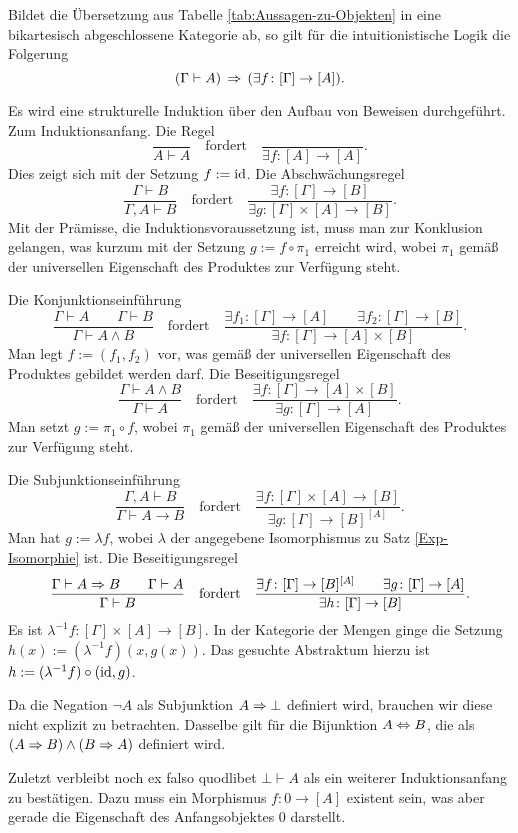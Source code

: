 \begin{Satz}\label{Urteil-impliziert-Morphismus}
Bildet die Übersetzung aus Tabelle \ref{tab:Aussagen-zu-Objekten} in
eine bikartesisch abgeschlossene Kategorie ab, so gilt für die
intuitionistische Logik die Folgerung
\[(\Gamma\vdash A) \,\Rightarrow\, (\exists f\colon [\Gamma]\to [A]).\]
\end{Satz}
\begin{Beweis}
Es wird eine strukturelle Induktion über den Aufbau von Beweisen
durchgeführt. Zum Induktionsanfang. Die Regel
\[\dfrac{}{A\vdash A}\quad\text{fordert}\quad\dfrac{}{\exists f\colon [A]\to [A]}.\]
Dies zeigt sich mit der Setzung $f:=\operatorname{id}$. Die Abschwächungsregel
\[\dfrac{\Gamma\vdash B}{\Gamma,A\vdash B}\quad\text{fordert}\quad
\dfrac{\exists f\colon [\Gamma]\to [B]}{\exists g\colon [\Gamma]\times [A]\to [B]}.\]
Mit der Prämisse, die Induktionsvoraussetzung ist, muss man zur
Konklusion gelangen, was kurzum mit der Setzung $g:=f\circ\pi_1$
erreicht wird, wobei $\pi_1$ gemäß der universellen Eigenschaft des
Produktes zur Verfügung steht.

Die Konjunktionseinführung
\[\dfrac{\Gamma\vdash A\qquad\Gamma\vdash B}{\Gamma\vdash A\land B}
\quad\text{fordert}\quad
\dfrac{\exists f_1\colon [\Gamma]\to [A]\qquad\exists f_2\colon [\Gamma]\to [B]}
{\exists f\colon [\Gamma]\to [A]\times [B]}.\]
Man legt $f:=(f_1, f_2)$ vor, was gemäß der universellen
Eigenschaft des Produktes gebildet werden darf. Die Beseitigungsregel
\[\dfrac{\Gamma\vdash A\land B}{\Gamma\vdash A}\quad\text{fordert}\quad
\dfrac{\exists f\colon [\Gamma]\to [A]\times [B]}
{\exists g\colon [\Gamma]\to [A]}.\]
Man setzt $g:=\pi_1\circ f$, wobei $\pi_1$ gemäß der universellen
Eigenschaft des Produktes zur Verfügung steht.

Die Subjunktionseinführung
\[\dfrac{\Gamma,A\vdash B}{\Gamma\vdash A\to B}\quad\text{fordert}\quad
\dfrac{\exists f\colon [\Gamma]\times [A]\to [B]}{\exists g\colon [\Gamma]\to [B]^{[A]}}.\]
Man hat $g:=\lambda f$, wobei $\lambda$ der angegebene Isomorphismus zu
Satz \ref{Exp-Isomorphie} ist. Die Beseitigungsregel
\[\dfrac{\Gamma\vdash A\Rightarrow B\qquad\Gamma\vdash A}{\Gamma\vdash B}\quad\text{fordert}\quad
\dfrac{\exists f\colon [\Gamma]\to [B]^{[A]}\qquad\exists g\colon [\Gamma]\to [A]}
{\exists h\colon [\Gamma]\to [B]}.\]
Es ist $\lambda^{-1} f\colon [\Gamma]\times [A]\to [B]$. In der Kategorie
der Mengen ginge die Setzung $h(x) := (\lambda^{-1} f)(x, g(x))$. Das
gesuchte Abstraktum hierzu ist $h := (\lambda^{-1} f)\circ (\operatorname{id}, g)$.

Da die Negation $\lnot A$ als Subjunktion $A\Rightarrow\bot$ definiert wird,
brauchen wir diese nicht explizit zu betrachten. Dasselbe gilt für
die Bijunktion $A\Leftrightarrow B$, die als $(A\Rightarrow B)\land (B\Rightarrow A)$
definiert wird.

Zuletzt verbleibt noch ex falso quodlibet $\bot\vdash A$ als
ein weiterer Induktionsanfang zu bestätigen. Dazu muss ein Morphismus
$f\colon 0\to [A]$ existent sein, was aber gerade die Eigenschaft des
Anfangsobjektes $0$ darstellt.\,\qedsymbol
\end{Beweis}

